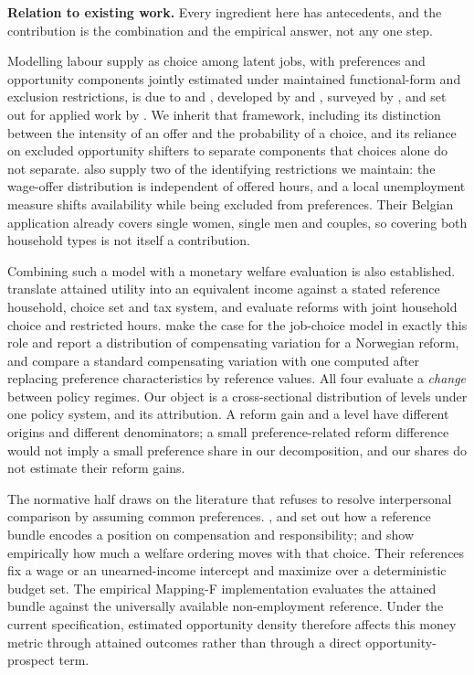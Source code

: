 \documentclass[11pt,a4paper]{article}
\begin{document}
\textbf{Relation to existing work.} Every ingredient here has antecedents, and the contribution is the combination and the empirical answer, not any one step.

Modelling labour supply as choice among latent jobs, with preferences and opportunity components jointly estimated under maintained functional-form and exclusion restrictions, is due to \citet{aaberge1995} and \citet{aaberge1999}, developed by \citet{dagsvikstrom2006} and \citet{dagsvikjia2016}, surveyed by \citet{aaberge2018}, and set out for applied work by \citet{capeau2016}. We inherit that framework, including its distinction between the intensity of an offer and the probability of a choice, and its reliance on excluded opportunity shifters to separate components that choices alone do not separate. \citet{capeau2016} also supply two of the identifying restrictions we maintain: the wage-offer distribution is independent of offered hours, and a local unemployment measure shifts availability while being excluded from preferences. Their Belgian application already covers single women, single men and couples, so covering both household types is not itself a contribution.

Combining such a model with a monetary welfare evaluation is also established. \citet{aaberge1995} translate attained utility into an equivalent income against a stated reference household, choice set and tax system, and \citet{aaberge2004} evaluate reforms with joint household choice and restricted hours. \citet{jiathoresen2021} make the case for the job-choice model in exactly this role and report a distribution of compensating variation for a Norwegian reform, and \citet{jacquet2026} compare a standard compensating variation with one computed after replacing preference characteristics by reference values. All four evaluate a \emph{change} between policy regimes. Our object is a cross-sectional distribution of levels under one policy system, and its attribution. A reform gain and a level have different origins and different denominators; a small preference-related reform difference would not imply a small preference share in our decomposition, and our shares do not estimate their reform gains.

The normative half draws on the literature that refuses to resolve interpersonal comparison by assuming common preferences. \citet{fleurbaeymaniquet2006}, \citet{fleurbaeymaniquet2017} and \citet{fleurbaeymaniquet2018} set out how a reference bundle encodes a position on compensation and responsibility; \citet{decosterhaan2015} and \citet{bargain2013} show empirically how much a welfare ordering moves with that choice. Their references fix a wage or an unearned-income intercept and maximize over a deterministic budget set. The empirical Mapping-F implementation evaluates the attained bundle against the universally available non-employment reference. Under the current specification, estimated opportunity density therefore affects this money metric through attained outcomes rather than through a direct opportunity-prospect term.
\end{document}
